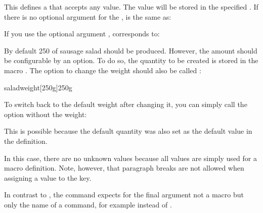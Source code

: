 \begin{Declaration}
\end{Declaration}
This defines a  that accepts
any value. The value will be stored in the specified . If there
is no optional argument for the ,  is
the same as:
If you use the optional argument , 
corresponds to:

\begin{Example}
  By default 250 of sausage salad should be produced. However, the
  amount should be configurable by an option. To do so, the quantity to be
  created is stored in the macro . The option to change
  the weight should also be called :
\begin{lstcode}
  \newcommand*{\saladweight}{250g}
                  {saladweight}[250g]{\saladweight}
\end{lstcode}
  To switch back to the default weight after changing it, you can simply
  call the option without the weight:
\begin{lstcode}
\end{lstcode}
  This is possible because the default quantity was also set as the default
  value in the definition.
\end{Example}
In this case, there are no unknown values because all values are simply used
for a macro definition. Note, however, that paragraph breaks are not allowed
when assigning a value to the key.

In contrast to ,
the  command expects for the final argument not a macro but
only the name of a command, for example  instead of
.%
%
\EndIndexGroup


